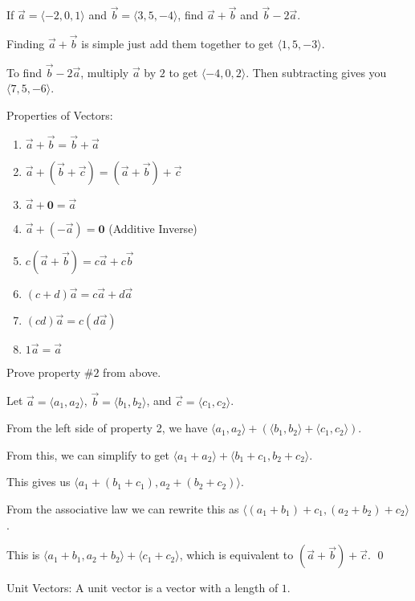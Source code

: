 \documentclass[../calc3.tex]{subfiles}
\begin{document}
\begin{example}
    If $\vec{a}=\langle -2,0,1\rangle$ and $\vec{b}=\langle 3,5,-4\rangle$, find $\vec{a}+\vec{b}$ and $\vec{b}-2\vec{a}$.

    Finding $\vec{a}+\vec{b}$ is simple just add them together to get $\langle 1,5,-3\rangle$.

    To find $\vec{b}-2\vec{a}$, multiply $\vec{a}$ by $2$ to get $\langle -4,0,2\rangle$. Then subtracting gives you $\langle 7,5,-6\rangle$.
\end{example}

Properties of Vectors:
\begin{enumerate}
    \item $\vec{a}+\vec{b}=\vec{b}+\vec{a}$
    \item $\vec{a}+(\vec{b}+\vec{c})=(\vec{a}+\vec{b})+\vec{c}$
    \item $\vec{a}+\textbf{0}=\vec{a}$
    \item $\vec{a}+(-\vec{a})=\textbf{0}$ (Additive Inverse)
    \item $c(\vec{a}+\vec{b})=c\vec{a}+c\vec{b}$
    \item $(c+d)\vec{a}=c\vec{a}+d\vec{a}$
    \item $(cd)\vec{a}=c(d\vec{a})$
    \item $1\vec{a}=\vec{a}$
\end{enumerate}

\begin{example}
    Prove property $\#2$ from above.

    Let $\vec{a}=\langle a_1,a_2\rangle$, $\vec{b}=\langle b_1,b_2\rangle$, and $\vec{c}=\langle c_1,c_2\rangle$.

    From the left side of property 2, we have $\langle a_1,a_2\rangle+(\langle b_1,b_2\rangle + \langle c_1,c_2\rangle)$.

    From this, we can simplify to get $\langle a_1+a_2\rangle + \langle b_1+c_1,b_2+c_2\rangle$.

    This gives us $\langle a_1+(b_1+c_1),a_2+(b_2+c_2)\rangle$.

    From the associative law we can rewrite this as $\langle (a_1+b_1)+c_1,(a_2+b_2)+c_2\rangle$.

    This is $\langle a_1+b_1,a_2+b_2\rangle + \langle c_1+c_2\rangle$, which is equivalent to $(\vec{a}+\vec{b})+\vec{c}$. \qed
\end{example}

Unit Vectors: A unit vector is a vector with a length of $1$.
\end{document}
